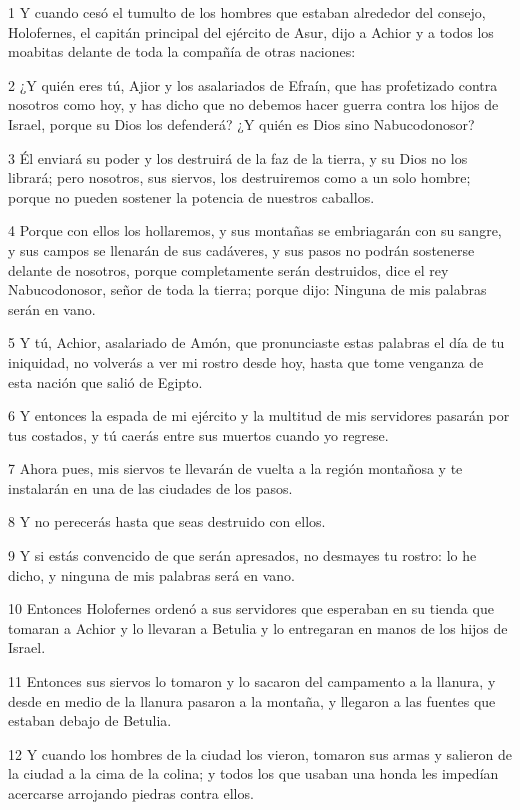 \par 1 Y cuando cesó el tumulto de los hombres que estaban alrededor del consejo, Holofernes, el capitán principal del ejército de Asur, dijo a Achior y a todos los moabitas delante de toda la compañía de otras naciones:
\par 2 ¿Y quién eres tú, Ajior y los asalariados de Efraín, que has profetizado contra nosotros como hoy, y has dicho que no debemos hacer guerra contra los hijos de Israel, porque su Dios los defenderá? ¿Y quién es Dios sino Nabucodonosor?
\par 3 Él enviará su poder y los destruirá de la faz de la tierra, y su Dios no los librará; pero nosotros, sus siervos, los destruiremos como a un solo hombre; porque no pueden sostener la potencia de nuestros caballos.
\par 4 Porque con ellos los hollaremos, y sus montañas se embriagarán con su sangre, y sus campos se llenarán de sus cadáveres, y sus pasos no podrán sostenerse delante de nosotros, porque completamente serán destruidos, dice el rey Nabucodonosor, señor de toda la tierra; porque dijo: Ninguna de mis palabras serán en vano.
\par 5 Y tú, Achior, asalariado de Amón, que pronunciaste estas palabras el día de tu iniquidad, no volverás a ver mi rostro desde hoy, hasta que tome venganza de esta nación que salió de Egipto.
\par 6 Y entonces la espada de mi ejército y la multitud de mis servidores pasarán por tus costados, y tú caerás entre sus muertos cuando yo regrese.
\par 7 Ahora pues, mis siervos te llevarán de vuelta a la región montañosa y te instalarán en una de las ciudades de los pasos.
\par 8 Y no perecerás hasta que seas destruido con ellos.
\par 9 Y si estás convencido de que serán apresados, no desmayes tu rostro: lo he dicho, y ninguna de mis palabras será en vano.
\par 10 Entonces Holofernes ordenó a sus servidores que esperaban en su tienda que tomaran a Achior y lo llevaran a Betulia y lo entregaran en manos de los hijos de Israel.
\par 11 Entonces sus siervos lo tomaron y lo sacaron del campamento a la llanura, y desde en medio de la llanura pasaron a la montaña, y llegaron a las fuentes que estaban debajo de Betulia.
\par 12 Y cuando los hombres de la ciudad los vieron, tomaron sus armas y salieron de la ciudad a la cima de la colina; y todos los que usaban una honda les impedían acercarse arrojando piedras contra ellos.

